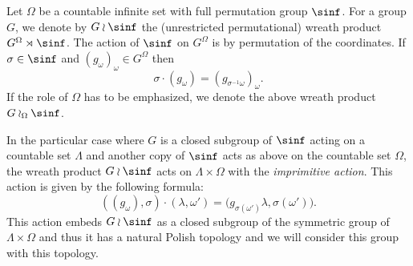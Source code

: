 Let $\Omega$ be a countable infinite set with full permutation group $\sinf$. For a group $G$, we denote by $G\wr \sinf$ the (unrestricted permutational) wreath product $G^\Omega\rtimes\sinf$. The action of $\sinf$ on $G^\Omega$ is by permutation of the coordinates. If $\sigma\in\sinf$ and $(g_\omega)_\omega\in G^\Omega$ then
\[
\sigma\cdot(g_\omega)=(g_{\sigma^{-1}\omega})_\omega.
\]
If the role of $\Omega$ has to be emphasized, we denote the above wreath product $G\wr_\Omega \sinf$.

In the particular case where $G$ is a closed subgroup of $\sinf$ acting on a countable set $\Lambda$ and another copy of $\sinf$ acts as above on the countable set $\Omega$, the wreath product $G\wr\sinf$ acts on $\Lambda\times \Omega$ with the \emph{imprimitive action}. This action is given by the following formula:
\[
\left((g_\omega),\sigma\right)\cdot(\lambda,\omega')=\bigl(g_{\sigma(\omega')}\lambda,\sigma(\omega')\bigr).
\]
This action embeds $G\wr\sinf$ as a closed subgroup of the symmetric group of $\Lambda\times \Omega$ and thus it has a natural Polish topology and we will consider this group with this topology.
